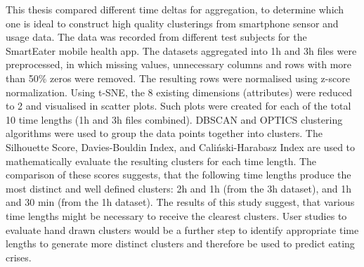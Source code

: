 This thesis compared different time deltas for aggregation, to determine which one is ideal to construct high quality clusterings from smartphone sensor and usage data. The data was recorded from different test subjects for the SmartEater mobile health app. The datasets aggregated into 1h and 3h files were preprocessed, in which missing values, unnecessary columns and rows with more than 50\% zeros were removed. The resulting rows were normalised using z-score normalization. Using t-SNE, the 8 existing dimensions (attributes) were reduced to 2 and visualised in scatter plots. Such plots were created for each of the total 10 time lengths (1h and 3h files combined). DBSCAN and OPTICS clustering algorithms were used to group the data points together into clusters. The Silhouette Score, Davies-Bouldin Index, and Caliński-Harabasz Index are used to mathematically evaluate the resulting clusters for each time length. The comparison of these scores suggests, that the following time lengths produce the most distinct and well defined clusters: 2h and 1h (from the 3h dataset), and 1h and 30 min (from the 1h dataset). The results of this study suggest, that various time lengths might be necessary to receive the clearest clusters. User studies to evaluate hand drawn clusters would be a further step to identify appropriate time lengths to generate more distinct clusters and therefore be used to predict eating crises.
